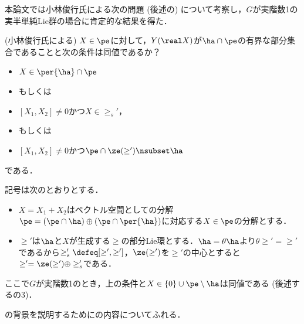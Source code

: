本論文では小林俊行氏による次の問題 (後述の) について考察し，$G$が実階数1の実半単純Lie群の場合に肯定的な結果を得た．
\begin{prob*}(小林俊行氏による)
  $X\in  \pe$に対して，$Y(\real X)$が$ \ha\cap \pe$の有界な部分集合であることと次の条件は同値であるか？
  \begin{cond*}
    \leavevmode
    \begin{itemize}
    \item $X\in \per{\ha}\cap\pe $
    \item[] もしくは
    \item $[X_1, X_2] \neq 0 $かつ$X\in \ge_{s}' $，
    \item[] もしくは
    \item $[X_1, X_2] \neq 0 $かつ$\pe\cap \ze(\ge') \nsubset \ha  $
    \end{itemize}
    である．
  \end{cond*}

  記号は次のとおりとする．
  \begin{itemize}
  \item $X = X_1 + X_2 $はベクトル空間としての分解$\pe =(\pe\cap \ha)\oplus(\pe\cap\per{\ha}) $に対応する$X\in \pe$の分解とする．
  \item $\ge ' $は$\ha$と$X$が生成する$\ge$の部分Lie環とする．$\ha = \theta \ha$より$\theta \ge' = \ge'$であるから$\ge'_{s} \defeq [\ge',\ge'] $，$\ze(\ge') $を$\ge'$の中心とすると$\ge' = \ze(\ge') \oplus \ge'_{s} $である．
  \end{itemize}
\end{prob*}

ここで$G$が実階数1のとき，上の条件と$X\in \{0\}\cup\pe\setminus\ha $は同値である (後述するの3)．



の背景を説明するために\cite{ber88}の内容についてふれる．

